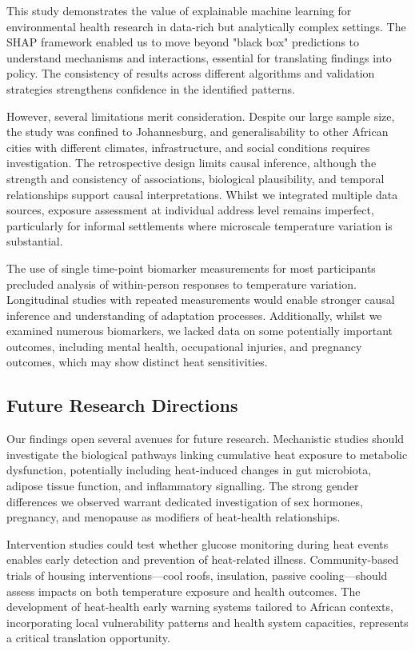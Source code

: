 \documentclass[11pt,a4paper]{article}
\begin{document}
This study demonstrates the value of explainable machine learning for environmental health research in data-rich but analytically complex settings. The SHAP framework enabled us to move beyond "black box" predictions to understand mechanisms and interactions, essential for translating findings into policy. The consistency of results across different algorithms and validation strategies strengthens confidence in the identified patterns.

However, several limitations merit consideration. Despite our large sample size, the study was confined to Johannesburg, and generalisability to other African cities with different climates, infrastructure, and social conditions requires investigation. The retrospective design limits causal inference, although the strength and consistency of associations, biological plausibility, and temporal relationships support causal interpretations. Whilst we integrated multiple data sources, exposure assessment at individual address level remains imperfect, particularly for informal settlements where microscale temperature variation is substantial.

The use of single time-point biomarker measurements for most participants precluded analysis of within-person responses to temperature variation. Longitudinal studies with repeated measurements would enable stronger causal inference and understanding of adaptation processes. Additionally, whilst we examined numerous biomarkers, we lacked data on some potentially important outcomes, including mental health, occupational injuries, and pregnancy outcomes, which may show distinct heat sensitivities.

\subsection{Future Research Directions}

Our findings open several avenues for future research. Mechanistic studies should investigate the biological pathways linking cumulative heat exposure to metabolic dysfunction, potentially including heat-induced changes in gut microbiota, adipose tissue function, and inflammatory signalling. The strong gender differences we observed warrant dedicated investigation of sex hormones, pregnancy, and menopause as modifiers of heat-health relationships.

Intervention studies could test whether glucose monitoring during heat events enables early detection and prevention of heat-related illness. Community-based trials of housing interventions—cool roofs, insulation, passive cooling—should assess impacts on both temperature exposure and health outcomes. The development of heat-health early warning systems tailored to African contexts, incorporating local vulnerability patterns and health system capacities, represents a critical translation opportunity.
\end{document}
